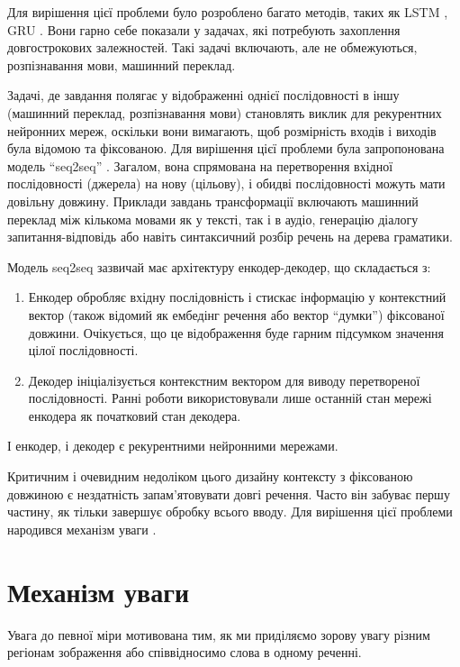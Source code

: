 Для вирішення цієї проблеми було розроблено багато
методів, таких як LSTM \cite{nn:lstm}, GRU \cite{nn:gru}. Вони
гарно себе показали у задачах, які потребують захоплення
довгострокових залежностей. Такі задачі включають, але не обмежуються,
розпізнавання мови, машинний переклад.

Задачі, де завдання полягає у відображенні однієї послідовності в
іншу (машинний переклад, розпізнавання мови) становлять
виклик для рекурентних
нейронних мереж, оскільки вони вимагають, щоб розмірність
входів і виходів була відомою та фіксованою.
Для вирішення цієї проблеми була запропонована
модель ``seq2seq'' \cite{nn:seq2seq}. Загалом, вона спрямована
на перетворення вхідної послідовності (джерела) на нову (цільову),
і обидві послідовності можуть мати довільну довжину.
Приклади завдань трансформації включають машинний переклад
між кількома мовами як у тексті, так і в аудіо,
генерацію діалогу запитання-відповідь або навіть синтаксичний
розбір речень на дерева граматики.

Модель seq2seq зазвичай має архітектуру енкодер-декодер, що складається з:

\begin{enumerate}[label=--]
    \item Енкодер обробляє вхідну послідовність і стискає інформацію
    у контекстний вектор (також відомий як ембедінг речення
    або вектор ``думки'') фіксованої довжини. Очікується,
    що це відображення буде гарним підсумком значення
    цілої послідовності.
    \item Декодер ініціалізується контекстним вектором для
    виводу перетвореної послідовності. Ранні роботи
    використовували лише останній стан мережі
    енкодера як початковий стан декодера.
\end{enumerate}

І енкодер, і декодер є рекурентними нейронними мережами.

Критичним і очевидним недоліком цього дизайну контексту з
фіксованою довжиною є нездатність запам'ятовувати довгі речення.
Часто він забуває першу частину, як тільки завершує обробку всього
вводу. Для вирішення цієї проблеми народився
механізм уваги \cite{nn:attention}.

\section{Механізм уваги}
Увага до певної міри мотивована тим, як ми приділяємо зорову увагу
різним регіонам зображення або співвідносимо слова в одному реченні.

